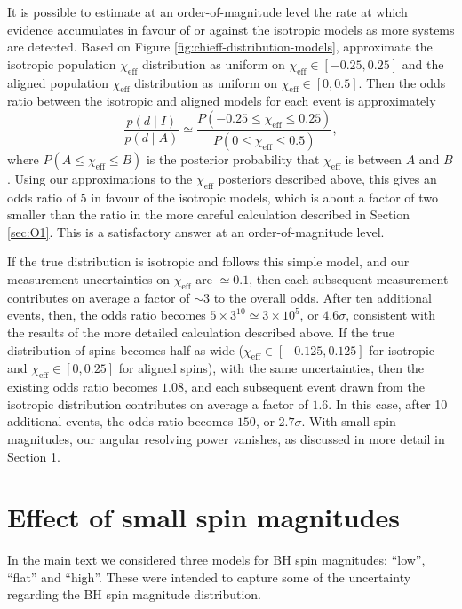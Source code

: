 \documentclass[modern,linenumbers]{aastex61}
\newcommand{\chieff}{\chi_\mathrm{eff}}
\begin{document}
It is possible to estimate at an order-of-magnitude level the rate at
which evidence accumulates in favour of or against the isotropic
models as more systems are detected.  Based on Figure
\ref{fig:chieff-distribution-models}, approximate the isotropic
population $\chieff$ distribution as uniform on
$\chieff \in \left[ -0.25, 0.25 \right]$ and the aligned population
$\chieff$ distribution as uniform on
$\chieff \in \left[0, 0.5\right]$.  Then the odds ratio between the
isotropic and aligned models for each event is approximately
\begin{equation}
  \label{eq:approx-odds}
  \frac{p\left( d \mid I \right)}{p\left( d \mid A \right)} \simeq
  \frac{P\left( -0.25 \leq \chieff \leq 0.25 \right)}{P\left( 0 \leq \chieff \leq 0.5 \right) },
\end{equation}
where $P\left( A \leq \chieff \leq B \right)$ is the posterior
probability that $\chieff$ is between $A$ and $B$.  Using our
approximations to the $\chieff$ posteriors described above, this gives
an odds ratio of $5$ in favour of the isotropic models, which is about
a factor of two smaller than the ratio in the more careful calculation
described in Section \ref{sec:O1}.  This is a satisfactory answer at
an order-of-magnitude level.

If the true distribution is isotropic and follows this simple model,
and our measurement uncertainties on $\chieff$ are $\simeq 0.1$, then
each subsequent measurement contributes on average a factor of
$\sim 3$ to the overall odds.  After ten additional events, then, the
odds ratio becomes $5 \times 3^{10} \simeq 3 \times 10^{5}$, or
$4.6 \sigma$, consistent with the results of the more detailed
calculation described above.  If the true distribution of spins
becomes half as wide ($\chieff \in [-0.125, 0.125]$ for isotropic and
$\chieff \in [0, 0.25]$ for aligned spins), with the same
uncertainties, then the existing odds ratio becomes $1.08$, and each
subsequent event drawn from the isotropic distribution contributes on
average a factor of $1.6$.  In this case, after 10 additional events,
the odds ratio becomes $150$, or $2.7\sigma$.  With small spin
magnitudes, our angular resolving power vanishes, as discussed in more
detail in Section \ref{sec:smallspins}.

\section{Effect of small spin magnitudes}
\label{sec:smallspins}

In the main text we considered three models for BH spin magnitudes: ``low'', ``flat'' and ``high''. These were intended to capture some of the uncertainty regarding the BH spin magnitude distribution.
\end{document}
